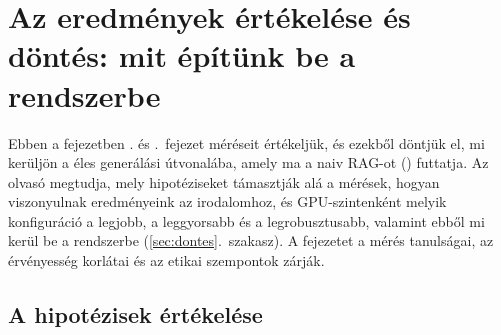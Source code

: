 \chapter{Az eredmények értékelése és döntés: mit építünk be a rendszerbe}
\label{ch:diszkusszio}

Ebben a fejezetben \az{\ref{ch:eredmenyek}}. és \az{\ref{ch:modellek}}.~fejezet méréseit értékeljük, és
ezekből döntjük el, mi kerüljön a \Mimir{} éles generálási útvonalába, amely ma a naiv RAG-ot ()
futtatja. Az olvasó megtudja, mely hipotéziseket támasztják alá a mérések, hogyan viszonyulnak
eredményeink az irodalomhoz, és GPU-szintenként melyik konfiguráció a legjobb, a leggyorsabb és a
legrobusztusabb, valamint ebből mi kerül be a rendszerbe (\ref{sec:dontes}.~szakasz). A fejezetet a mérés
tanulságai, az érvényesség korlátai és az etikai szempontok zárják.

\section{A hipotézisek értékelése}
\label{sec:hipotezis-ertekeles}

